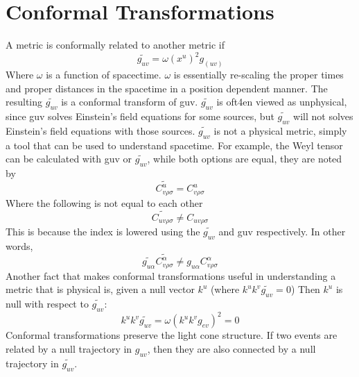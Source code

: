 \documentclass[10pt]{article}
\begin{document}
              	\section{Conformal Transformations }\label{sec:class_style}
              		 A metric is conformally related to another metric if
              		 \begin{equation}
              		 \widetilde{g_{uv}}=\omega(x^u)^2g_(uv)
              		 \end{equation}
              		 Where \(\omega\) is a function of spacectime.  \(\omega\) is essentially re-scaling the proper times and proper distances in the spacetime in a position dependent manner. The resulting 	\(\widetilde{g_{uv}}\) is a conformal transform of guv.
              	\(\widetilde{g_{uv}}\) is oft4en viewed as unphysical, since guv solves Einstein's field equations for some sources, but 	\(\widetilde{g_{uv}}\) will not solves Einstein's field equations with those sources. 	\(\widetilde{g_{uv}}\) is not a physical metric, simply a tool that can be used to understand spacetime.
              		 For example, the Weyl tensor can be calculated with guv or 	\(\widetilde{g_{uv}}\), while both options are equal, they are noted by 
              		  \begin{equation}
              		\widetilde{C^u_{v\rho\sigma}}=C^u_{v\rho\sigma}
              		 \end{equation}
              		 Where the following is not equal to each other
              		   \begin{equation}
              		\widetilde{C_{uv\rho\sigma}}\neq{C_{uv\rho\sigma}}
              		 \end{equation}
              		 This is because the index is lowered using the 	\(\widetilde{g_{uv}}\) and guv respectively. In other words, 
              		  \begin{equation}
              	 \widetilde{g_{u\alpha}}\widetilde{C^\alpha_{v\rho\sigma}}\neq{g_{u\alpha}C^\alpha_{v\rho\sigma}}
              		 \end{equation}
              		  	Another fact that makes conformal transformations useful in understanding a metric that is physical is, given a null vector \(k^u\) (where \(k^uk^v\widetilde{g_{uv}}=0\)) Then \(k^u\) is null with respect to \(\widetilde{g_{uv}}\):
              		  		 \begin{equation}
              		 k^uk^v\widetilde{g_{uv}}=\omega(k^uk^vg_{ev})^2=0
              		 \end{equation}
              		 Conformal transformations preserve the light cone structure. If two events are related by a null trajectory in \({g_{uv}}\), then they are also connected by a null trajectory in 	\(\widetilde{g_{uv}}\). 
              		 
\end{document}
